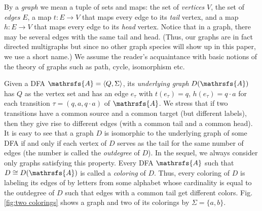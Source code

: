 \documentclass[12pt,twoside]{article}
\begin{document}
By a \emph{graph} we mean a tuple of sets and maps: the set of \emph{vertices}
$V$, the set of \emph{edges} $E$, a map $t: E\to V$ that maps every edge to its
\emph{tail} vertex, and a map $h:E\to V$ that maps every edge to its
\emph{head} vertex. Notice that in a graph, there may be several edges with the
same tail and head. (Thus, our graphs are in fact directed multigraphs but
since no other graph species will show up in this paper, we use a short name.)
We assume the reader's acquaintance with basic notions of the theory of graphs
such as path, cycle, isomorphism etc.

Given a DFA $\mathrsfs{A}=\langle Q,\Sigma\rangle$, its \emph{underlying graph}
$D(\mathrsfs{A})$ has $Q$ as the vertex set and has an edge $e_\tau$ with
$t(e_\tau)=q$, $h(e_\tau)=q\cdot a$ for each transition $\tau=(q,a,q\cdot a)$
of $\mathrsfs{A}$. We stress that if two transitions have a common source and a
common target (but different labels), then they give rise to different edges
(with a common tail and a common head). It is easy to see that a graph $D$ is
isomorphic to the underlying graph of some DFA if and only if each vertex of
$D$ serves as the tail for the same number of edges (the number is called the
\emph{outdegree} of $D$). In the sequel, we always consider only graphs
satisfying this property. Every DFA $\mathrsfs{A}$ such that $D\cong
D(\mathrsfs{A})$ is called a \emph{coloring} of $D$. Thus, every coloring of
$D$ is labeling its edges of by letters from some alphabet whose cardinality is
equal to the outdegree of $D$ such that edges with a common tail get different
colors. Fig.\,\ref{fig:two colorings} shows a graph and two of its colorings by
$\Sigma=\{a,b\}$.
\end{document}
